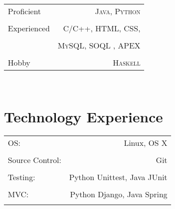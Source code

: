 \documentclass[10pt]{article} %
\begin{document}
\begin{minipage}[t]{0.44\textwidth}
\begin{tabular}{l r}
Proficient
& \textsc{Java}, \textsc{Python} \\  \hfill \\
Experienced
& \textsc{C/C++}, \textsc{HTML}, \textsc{CSS}, \\ \hfill \\
& \textsc{MySQL, SOQL} , \textsc{APEX}\\ \hfill \\
Hobby
& \textsc{Haskell} \hfill
\end{tabular}\\

\section{\color{section} \sffamily Technology Experience}
\begin{tabular}{lr}
OS: & Linux, OS X \\ \hfill \\
Source Control: & Git \\ \hfill \\
Testing: & Python Unittest, Java JUnit \\ \hfill \\
MVC: & Python Django, Java Spring \\ \hfill \\
\end{tabular}

\end{minipage} %
\end{document}
